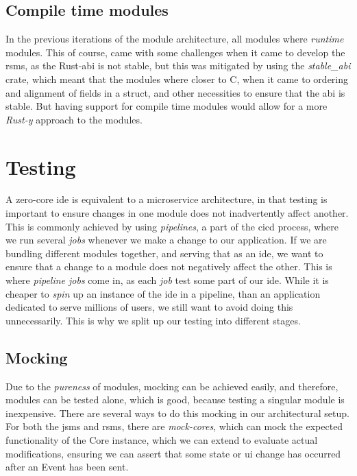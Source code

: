 \subsection{Compile time modules}

In the previous iterations of the module architecture, all modules where
\textit{runtime} modules. This of course, came with some challenges when it came
to develop the \gls{rsms}, as the Rust-\gls{abi} is not stable, but this was
mitigated by using the \textit{stable\_abi} crate, which meant that the modules
where closer to C, when it came to ordering and alignment of fields in a struct,
and other necessities to ensure that the \gls{abi} is stable. But having support
for compile time modules would allow for a more \textit{Rust-y} approach to the
modules.

\section{Testing} \label{sec:testing}

A zero-core \gls{ide} is equivalent to a microservice architecture, in that
testing is important to ensure changes in one module does not inadvertently
affect another. This is commonly achieved by using \textit{pipelines}, a part
of the \gls{cicd} process, where we run several \textit{jobs} whenever we make a
change to our application. If we are bundling different modules together, and
serving that as an \gls{ide}, we want to ensure that a change to a module does
not negatively affect the other. This is where \textit{pipeline jobs} come in,
as each \textit{job} test some part of our \gls{ide}. While it is cheaper to
\textit{spin} up an instance of the \gls{ide} in a pipeline, than an application
dedicated to serve millions of users, we still want to avoid doing this
unnecessarily. This is why we split up our testing into different stages.

\subsection{Mocking}

Due to the \textit{pureness} of modules, mocking can be achieved easily, and
therefore, modules can be tested alone, which is good, because testing a
singular module is inexpensive. There are several ways to do this mocking in our
architectural setup. For both the \gls{jsms} and \gls{rsms}, there are
\textit{mock-cores}, which can mock the expected functionality of the Core
instance, which we can extend to evaluate actual modifications, ensuring we can
assert that some state or \gls{ui} change has occurred after an Event has been
sent.

